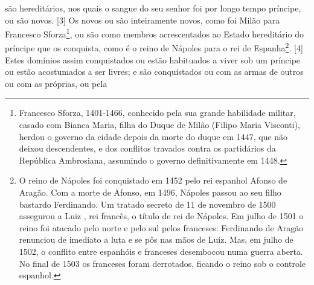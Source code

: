são hereditários, nos quais o sangue do seu senhor foi por longo tempo
príncipe, ou são novos. {[}3{]} Os novos ou são inteiramente novos, como
foi Milão para Francesco Sforza\footnote{Francesco Sforza, 1401-1466,
  conhecido pela sua grande habilidade militar, casado com Bianca Maria,
  filha do Duque de Milão (Filipo Maria Visconti), herdou o governo da
  cidade depois da morte do duque em 1447, que não deixou descendentes,
  e dos conflitos travados contra os partidários da República
  Ambrosiana, assumindo o governo definitivamente em 1448.}, ou são como
membros acrescentados ao Estado hereditário do príncipe que os
conquista, como é o reino de Nápoles para o rei de Espanha\footnote{O
  reino de Nápoles foi conquistado em 1452 pelo rei espanhol Afonso  de
  Aragão. Com a morte de Afonso, em 1496, Nápoles passou ao seu filho
  bastardo Ferdinando. Um tratado secreto de 11 de novembro de 1500
  assegurou a Luiz , rei francês, o título de rei de Nápoles. Em
  julho de 1501 o reino foi atacado pelo norte e pelo sul pelos
  franceses: Ferdinando  de Aragão renunciou de imediato a luta e se
  pôs nas mãos de Luiz. Mas, em julho de 1502, o conflito entre
  espanhóis e franceses desembocou numa guerra aberta. No final de 1503
  os franceses foram derrotados, ficando o reino sob o controle
  espanhol.}. {[}4{]} Estes domínios assim conquistados ou estão
habituados a viver sob um príncipe ou estão acostumados a ser livres; e
são conquistados ou com as armas de outros ou com as próprias, ou pela

